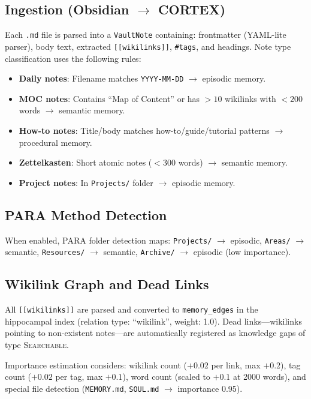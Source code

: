 \documentclass[runningheads]{llncs}
\begin{document}
\subsection{Ingestion (Obsidian $\rightarrow$ CORTEX)}

Each \texttt{.md} file is parsed into a \texttt{VaultNote} containing: frontmatter (YAML-lite parser), body text, extracted \texttt{[[wikilinks]]}, \texttt{\#tags}, and headings. Note type classification uses the following rules:
\begin{itemize}[leftmargin=*]
    \item \textbf{Daily notes}: Filename matches \texttt{YYYY-MM-DD} $\rightarrow$ episodic memory.
    \item \textbf{MOC notes}: Contains ``Map of Content'' or has $>10$ wikilinks with $<200$ words $\rightarrow$ semantic memory.
    \item \textbf{How-to notes}: Title/body matches how-to/guide/tutorial patterns $\rightarrow$ procedural memory.
    \item \textbf{Zettelkasten}: Short atomic notes ($<300$ words) $\rightarrow$ semantic memory.
    \item \textbf{Project notes}: In \texttt{Projects/} folder $\rightarrow$ episodic memory.
\end{itemize}

\subsection{PARA Method Detection}

When enabled, PARA folder detection maps: \texttt{Projects/} $\rightarrow$ episodic, \texttt{Areas/} $\rightarrow$ semantic, \texttt{Resources/} $\rightarrow$ semantic, \texttt{Archive/} $\rightarrow$ episodic (low importance).

\subsection{Wikilink Graph and Dead Links}

All \texttt{[[wikilinks]]} are parsed and converted to \texttt{memory\_edges} in the hippocampal index (relation type: ``wikilink'', weight: 1.0). Dead links---wikilinks pointing to non-existent notes---are automatically registered as knowledge gaps of type \textsc{Searchable}.

Importance estimation considers: wikilink count ($+0.02$ per link, max $+0.2$), tag count ($+0.02$ per tag, max $+0.1$), word count (scaled to $+0.1$ at 2000 words), and special file detection (\texttt{MEMORY.md}, \texttt{SOUL.md} $\rightarrow$ importance 0.95).
\end{document}
